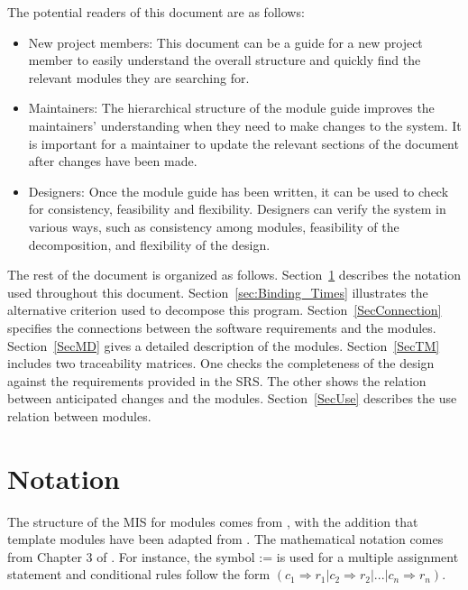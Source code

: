 \documentclass[12pt, titlepage]{article}
\begin{document}
The potential readers of this document are as follows:

\begin{itemize}
\item New project members: This document can be a guide for a new project member
  to easily understand the overall structure and quickly find the
  relevant modules they are searching for.
\item Maintainers: The hierarchical structure of the module guide improves the
  maintainers' understanding when they need to make changes to the system. It is
  important for a maintainer to update the relevant sections of the document
  after changes have been made.
\item Designers: Once the module guide has been written, it can be used to
  check for consistency, feasibility and flexibility. Designers can verify the
  system in various ways, such as consistency among modules, feasibility of the
  decomposition, and flexibility of the design.
\end{itemize}

The rest of the document is organized as follows. Section~\ref{sec:Notation} 
describes the notation used throughout this document. 
Section~\ref{sec:Binding_Times} illustrates the alternative criterion used to 
decompose this program.
Section~\ref{SecConnection} specifies the connections between the software 
requirements and the modules. Section~\ref{SecMD} gives a detailed description 
of the modules. Section~\ref{SecTM} includes two traceability matrices. 
One checks the completeness of the design against the requirements provided in 
the SRS. The other shows the relation between anticipated changes and the 
modules. Section~\ref{SecUse} describes the use relation between modules.

\section{Notation}\label{sec:Notation}


The structure of the MIS for modules comes from \citet{HoffmanAndStrooper1995},
with the addition that template modules have been adapted from
\cite{GhezziEtAl2003}.  The mathematical notation comes from Chapter 3 of
\citet{HoffmanAndStrooper1995}.  For instance, the symbol := is used for a
multiple assignment statement and conditional rules follow the form $(c_1
\Rightarrow r_1 | c_2 \Rightarrow r_2 | ... | c_n \Rightarrow r_n )$.
\end{document}
